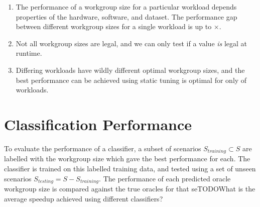 \begin{enumerate}
\item The performance of a workgroup size for a particular workload
  depends properties of the hardware, software, and dataset. The
  performance gap between different workgroup sizes for a single
  workload is up to $\times$.
\item Not all workgroup sizes are legal, and we can only test if a
  value \emph{is} legal at runtime.
\item Differing workloads have wildly different optimal workgroup
  sizes, and the best performance can be achieved using static tuning
  is optimal for only  of
  workloads.
\end{enumerate}



\section{Classification Performance}


To evaluate the performance of a classifier, a subset of scenarios
$S_{training} \subset S$ are labelled with the workgroup size which
gave the best performance for each. The classifier is trained on this
labelled training data, and tested using a set of unseen scenarios
$S_{testing} = S - S_{training}$. The performance of each predicted
oracle workgroup size is compared against the true oracles for that
seTODO{What is the average speedup achieved using different
  classifiers?}






